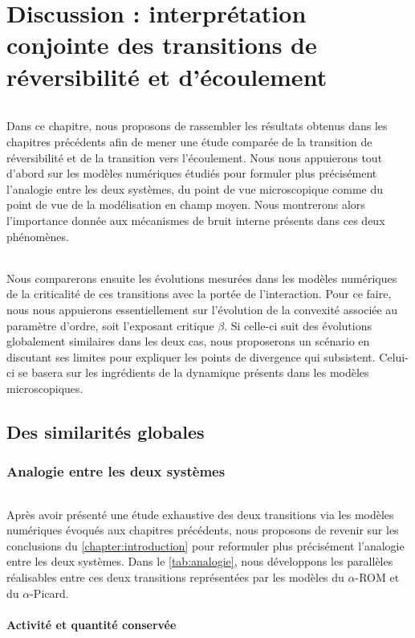 \chapter{Discussion : interprétation conjointe des transitions de réversibilité et d'écoulement}

\label{chapter:discussion}

\subparagraph{}Dans ce chapitre, nous proposons de rassembler les résultats obtenus dans les chapitres précédents afin de mener une étude comparée de la transition de réversibilité et de la transition vers l'écoulement. Nous nous appuierons tout d'abord sur les modèles numériques étudiés pour formuler plus précisément l'analogie entre les deux systèmes, du point de vue microscopique comme du point de vue de la modélisation en champ moyen. Nous montrerons alors l'importance donnée aux mécanismes de bruit interne présents dans ces deux phénomènes.

\subparagraph{}Nous comparerons ensuite les évolutions mesurées dans les modèles numériques de la criticalité de ces transitions avec la portée de l'interaction. Pour ce faire, nous nous appuierons essentiellement sur l'évolution de la convexité associée au paramètre d'ordre, soit l'exposant critique $\beta$. Si celle-ci suit des évolutions globalement similaires dans les deux cas, nous proposerons un scénario en discutant ses limites pour expliquer les points de divergence qui subsistent. Celui-ci se basera sur les ingrédients de la dynamique présents dans les modèles microscopiques.

\section{Des similarités globales}

\subsection{Analogie entre les deux systèmes}

\subparagraph{}Après avoir présenté une étude exhaustive des deux transitions via les modèles numériques évoqués aux chapitres précédents, nous proposons de revenir sur les conclusions du \autoref{chapter:introduction} pour reformuler plus précisément l'analogie entre les deux systèmes. Dans le \autoref{tab:analogie}, nous développons les parallèles réalisables entre ces deux transitions représentées par les modèles du $\alpha$-ROM et du $\alpha$-Picard.

\subsubsection{Activité et quantité conservée}

